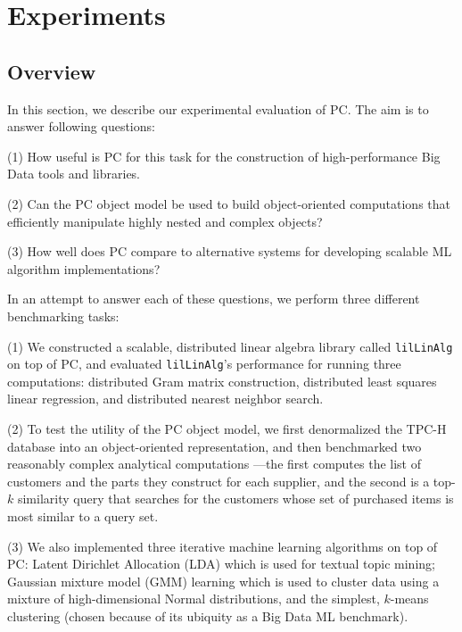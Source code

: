 
\section{Experiments}

\subsection{Overview}

In this section, we describe our experimental evaluation of PC.
The aim is to answer
following questions:

\vspace{5pt}
\noindent
(1) How useful is PC for this task for  the construction of high-performance Big Data tools and libraries.

\vspace{5pt}
\noindent
(2) Can the PC object model be used to build 
object-oriented computations that efficiently manipulate highly nested and complex objects?

\vspace{5pt}
\noindent
(3) How well does PC compare to alternative systems for developing scalable ML algorithm implementations?

\vspace{5pt}

\noindent In an attempt to answer each of these questions, we perform three different benchmarking tasks:

\vspace{5pt}
\noindent
(1) We constructed a scalable, distributed
linear algebra library
called \texttt{lilLinAlg} on top of PC, and evaluated \texttt{lilLinAlg}'s performance for running three
computations: distributed Gram matrix construction, 
distributed least squares linear regression, and distributed nearest neighbor search.

\vspace{5pt}
\noindent
(2) To test the utility of the PC object model, we first denormalized the TPC-H database \cite{council2008tpc} into an object-oriented 
representation, and then benchmarked two reasonably complex 
analytical computations ---the
first computes the list of customers and the parts they construct for each supplier, and the
second is a top-$k$ similarity query that searches for the customers whose set of purchased items is most similar
to a query set.

\vspace{5pt}
\noindent
(3) We also implemented three
  iterative machine learning algorithms on top of PC: Latent Dirichlet Allocation (LDA) which is used for
  textual topic mining;
  Gaussian mixture model (GMM) learning which is used to cluster data using a mixture of high-dimensional Normal
  distributions, and the simplest, $k$-means clustering (chosen because of its ubiquity as a Big Data ML benchmark).

